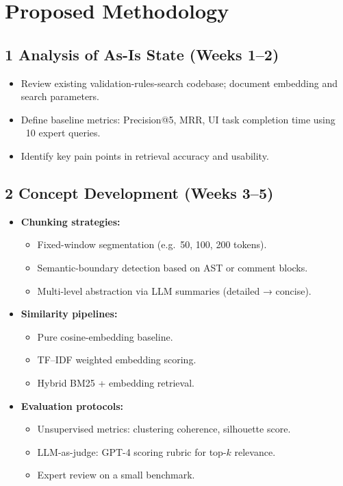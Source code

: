 \documentclass[12pt,a4paper]{article}
\begin{document}
\section*{Proposed Methodology}
\subsection*{1 Analysis of As-Is State (Weeks 1–2)}
\begin{itemize}
  \item Review existing validation-rules-search codebase; document embedding and search parameters.
  \item Define baseline metrics: Precision@5, MRR, UI task completion time using ~10 expert queries.
  \item Identify key pain points in retrieval accuracy and usability.
\end{itemize}

\subsection*{2 Concept Development (Weeks 3–5)}
\begin{itemize}
  \item \textbf{Chunking strategies:}
    \begin{itemize}
      \item Fixed-window segmentation (e.g.\ 50, 100, 200 tokens).
      \item Semantic-boundary detection based on AST or comment blocks.
      \item Multi-level abstraction via LLM summaries (detailed → concise).
    \end{itemize}
  \item \textbf{Similarity pipelines:}
    \begin{itemize}
      \item Pure cosine-embedding baseline.
      \item TF–IDF weighted embedding scoring.
      \item Hybrid BM25 + embedding retrieval.
    \end{itemize}
  \item \textbf{Evaluation protocols:}
    \begin{itemize}
      \item Unsupervised metrics: clustering coherence, silhouette score.
      \item LLM-as-judge: GPT-4 scoring rubric for top-\(k\) relevance.
      \item Expert review on a small benchmark.
    \end{itemize}
\end{itemize}
\end{document}
